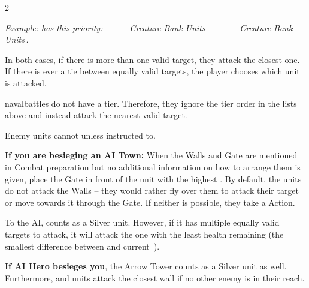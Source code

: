 \begin{multicols*}{2}
\begin{itemize}
    \textit{Example:  has this priority:
    - 
    - 
    - 
    - Creature Bank Units\,
    - 
    - 
    - 
    - 
    - Creature Bank Units\,.}
  \end{itemize}

  In both cases, if there is more than one valid target, they attack the closest one.
  If there is ever a tie between equally valid targets, the player chooses which unit is attacked.\par

  \begin{expansion}{navalbattles}
     do not have a tier.
    Therefore, they ignore the tier order in the lists above and instead attack the nearest valid target.
  \end{expansion}

  Enemy units cannot  unless instructed to.

  \textbf{If you are besieging an AI Town:} When the Walls and Gate are mentioned in Combat preparation but no additional information on how to arrange them is given, place the Gate in front of the  unit with the highest .
  By default, the units do not attack the Walls -- they would rather fly over them to attack their target or move towards it through the Gate.
  If neither is possible, they take a  Action.

  To the AI,  counts as a Silver  unit.
  However, if it has multiple equally valid targets to attack, it will attack the one with the least health remaining (the smallest difference between  and current~).

  \textbf{If AI Hero besieges you}, the Arrow Tower counts as a Silver  unit as well.
  Furthermore,  and  units attack the closest wall if no other enemy is in their reach.
\end{multicols*}

